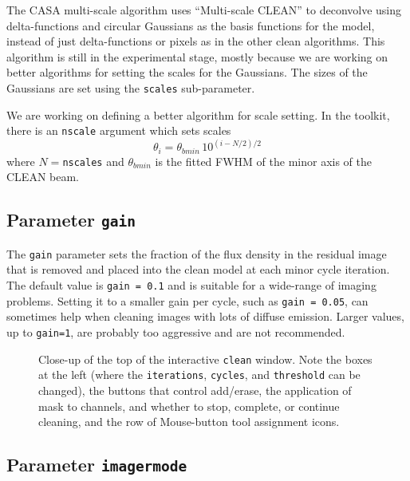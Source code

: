 The CASA multi-scale algorithm uses ``Multi-scale CLEAN'' to
deconvolve using delta-functions and circular Gaussians as the basis
functions for the model, instead of just delta-functions or pixels as
in the other clean algorithms.  This algorithm is still in the
experimental stage, mostly because we are working on better algorithms
for setting the scales for the Gaussians.  The sizes of the Gaussians
are set using the {\tt scales} sub-parameter.  

We are working on defining a better algorithm for scale setting.  In
the toolkit, there is an {\tt nscale} argument which sets scales
\begin{equation}
  \theta_i = \theta_{bmin}\,10^{(i-N/2)/2}
\end{equation}
where $N=${\tt nscales} and $\theta_{bmin}$ is the fitted FWHM of the minor
axis of the CLEAN beam.

\subsection{Parameter {\tt gain} }
\label{section:im.clean.gain}

The {\tt gain} parameter sets the fraction of the flux density in
the residual image that is removed and placed into the clean model
at each minor cycle iteration.  The default value is {\tt gain = 0.1}
and is suitable for a wide-range of imaging problems.  Setting it to
a smaller gain per cycle, such as {\tt gain = 0.05}, can sometimes 
help when cleaning images with lots of diffuse emission.  Larger values,
up to {\tt gain=1}, are probably too aggressive and are not recommended.

\begin{figure}[h!]
\begin{center}
\caption{\label{fig:clean_inter_control} Close-up of the top of the 
interactive {\tt clean} window.  Note the boxes at the left
(where the {\tt iterations}, {\tt cycles}, and {\tt threshold} can
be changed), the buttons that control add/erase, the application
of mask to channels, and whether to stop, complete, or continue
cleaning, and the row of Mouse-button tool assignment icons.} 
\hrulefill
\end{center}
\end{figure}

\subsection{Parameter {\tt imagermode} }
\label{section:im.clean.imagermode}

